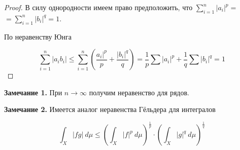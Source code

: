 \begin{proof}
  В силу однородности имеем право предположить, что $\sum_{i=1}^n |a_i|^p =$\\$= \sum_{i=1}^n |b_i|^q = 1$.

  По неравенству Юнга
  
  $$\sum_{i = 1}^{n} |a_ib_i| \leq \sum_{i = 1}^n \left( \frac{a_i|^p}{p} + \frac{|b_i|^q}{q}\right) =
  \frac{1}{p}\sum |a_i|^p + \frac{1}{q} \sum |b_i|^q = 1$$
\end{proof}

\textbf{Замечание 1.} При $n \to \infty$ получим неравенство для рядов.

\textbf{Замечание 2.} Имеется аналог неравенства Гёльдера для интегралов

\begin{theorem}
  $$\int_X |fg|\ d\mu \leq \left(\int_X |f|^p\ d\mu \right)^\frac{1}{p} \cdot \left(\int_X |g|^q\ d\mu \right)^\frac{1}{q}$$
\end{theorem}